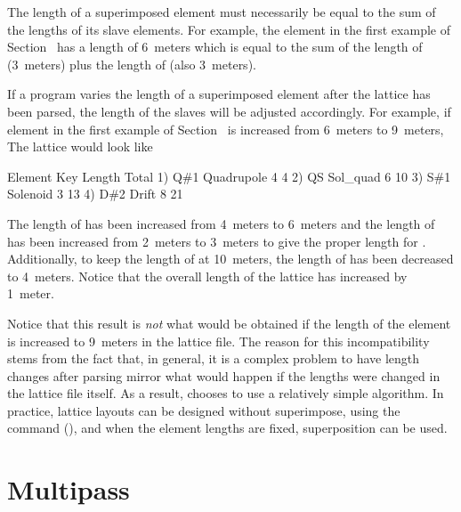 The length of a superimposed element must necessarily be equal to the
sum of the lengths of its slave elements. For example, the element
 in the first example of Section~ has a length of
6~meters which is equal to the sum of the length of 
(3~meters) plus the length of  (also 3~meters).

If a program varies the length of a superimposed element after the
lattice has been parsed, the length of the slaves will be adjusted
accordingly. For example, if element  in the first example
of Section~ is increased from 6~meters to 9~meters, The
lattice would look like
\begin{example}
        Element   Key         Length  Total
  1)    Q{\#}1       Quadrupole   4        4
  2)    Q{\B}S       Sol_quad     6       10
  3)    S{\#}1       Solenoid     3       13
  4)    D{\#}2       Drift        8       21
\end{example}
The length of  has been increased from 4~meters to 6~meters
and the length of  has been increased from 2~meters to
3~meters to give the proper length for . Additionally, to keep
the length of  at 10~meters, the length of  has been
decreased to 4~meters. Notice that the overall length of the lattice
has increased by 1~meter. 

Notice that this result is {\em not} what would be obtained if the
length of the element  is increased to 9~meters in the lattice
file. The reason for this incompatibility stems from the fact that, in
general, it is a complex problem to have length changes after parsing
mirror what would happen if the lengths were changed in the lattice
file itself. As a result, \bmad chooses to use a relatively simple
algorithm. In practice, lattice layouts can be designed without
superimpose, using the  command (), and when the
element lengths are fixed, superposition can be used.


\section{Multipass}
\label{s:multipass}

